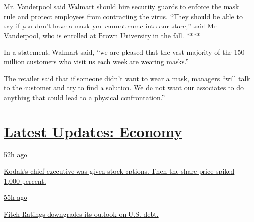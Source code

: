 Mr. Vanderpool said Walmart should hire security guards to enforce the
mask rule and protect employees from contracting the virus. ``They
should be able to say if you don't have a mask you cannot come into our
store,'' said Mr. Vanderpool, who is enrolled at Brown University in the
fall. ****

In a statement, Walmart said, ``we are pleased that the vast majority of
the 150 million customers who visit us each week are wearing masks.''

The retailer said that if someone didn't want to wear a mask, managers
``will talk to the customer and try to find a solution. We do not want
our associates to do anything that could lead to a physical
confrontation.''

\hypertarget{latest-updates-economy}{%
\section{\texorpdfstring{\href{https://www.nytimes3xbfgragh.onion/live/2020/07/31/business/stock-market-today-coronavirus?action=click\&pgtype=Article\&state=default\&region=MAIN_CONTENT_1\&context=storylines_live_updates}{Latest
Updates:
Economy}}{Latest Updates: Economy}}\label{latest-updates-economy}}

\href{https://www.nytimes3xbfgragh.onion/live/2020/07/31/business/stock-market-today-coronavirus?action=click\&pgtype=Article\&state=default\&region=MAIN_CONTENT_1\&context=storylines_live_updates\#kodaks-chief-executive-was-given-stock-options-then-the-share-price-spiked-1000-percent}{52h
ago}

\href{https://www.nytimes3xbfgragh.onion/live/2020/07/31/business/stock-market-today-coronavirus?action=click\&pgtype=Article\&state=default\&region=MAIN_CONTENT_1\&context=storylines_live_updates\#kodaks-chief-executive-was-given-stock-options-then-the-share-price-spiked-1000-percent}{Kodak's
chief executive was given stock options. Then the share price spiked
1,000 percent.}

\href{https://www.nytimes3xbfgragh.onion/live/2020/07/31/business/stock-market-today-coronavirus?action=click\&pgtype=Article\&state=default\&region=MAIN_CONTENT_1\&context=storylines_live_updates\#fitch-ratings-downgrades-its-outlook-on-us-debt}{55h
ago}

\href{https://www.nytimes3xbfgragh.onion/live/2020/07/31/business/stock-market-today-coronavirus?action=click\&pgtype=Article\&state=default\&region=MAIN_CONTENT_1\&context=storylines_live_updates\#fitch-ratings-downgrades-its-outlook-on-us-debt}{Fitch
Ratings downgrades its outlook on U.S. debt.}

